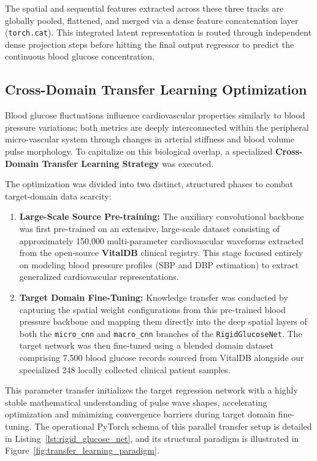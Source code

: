 The spatial and sequential features extracted across these three tracks are globally pooled, flattened, and merged via a dense feature concatenation layer (\texttt{torch.cat}). This integrated latent representation is routed through independent dense projection steps before hitting the final output regressor to predict the continuous blood glucose concentration.

\subsection{Cross-Domain Transfer Learning Optimization}
Blood glucose fluctuations influence cardiovascular properties similarly to blood pressure variations; both metrics are deeply interconnected within the peripheral micro-vascular system through changes in arterial stiffness and blood volume pulse morphology. To capitalize on this biological overlap, a specialized \textbf{Cross-Domain Transfer Learning Strategy} was executed.

The optimization was divided into two distinct, structured phases to combat target-domain data scarcity:
\begin{enumerate}
    \item \textbf{Large-Scale Source Pre-training:} The auxiliary convolutional backbone was first pre-trained on an extensive, large-scale dataset consisting of approximately 150,000 multi-parameter cardiovascular waveforms extracted from the open-source \textbf{VitalDB} clinical registry. This stage focused entirely on modeling blood pressure profiles (SBP and DBP estimation) to extract generalized cardiovascular representations.
    \item \textbf{Target Domain Fine-Tuning:} Knowledge transfer was conducted by capturing the spatial weight configurations from this pre-trained blood pressure backbone and mapping them directly into the deep spatial layers of both the \texttt{micro\_cnn} and \texttt{macro\_cnn} branches of the \texttt{RigidGlucoseNet}. The target network was then fine-tuned using a blended domain dataset comprising 7,500 blood glucose records sourced from VitalDB alongside our specialized 248 locally collected clinical patient samples.
\end{enumerate}

This parameter transfer initializes the target regression network with a highly stable mathematical understanding of pulse wave shapes, accelerating optimization and minimizing convergence barriers during target domain fine-tuning. The operational PyTorch schema of this parallel transfer setup is detailed in Listing~\ref{lst:rigid_glucose_net}, and its structural paradigm is illustrated in Figure~\ref{fig:transfer_learning_paradigm}.

